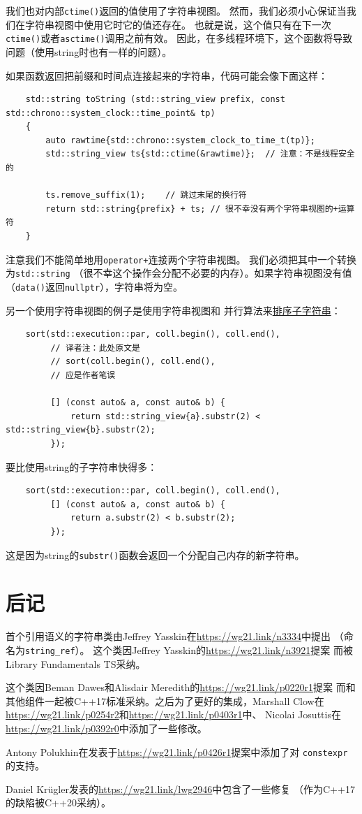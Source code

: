 我们也对内部\texttt{ctime()}返回的值使用了字符串视图。
然而，我们必须小心保证当我们在字符串视图中使用它时它的值还存在。
也就是说，这个值只有在下一次\texttt{ctime()}或者\texttt{asctime()}调用之前有效。
因此，在多线程环境下，这个函数将导致问题（使用string时也有一样的问题）。

如果函数返回把前缀和时间点连接起来的字符串，代码可能会像下面这样：
\begin{lstlisting}
    std::string toString (std::string_view prefix, const std::chrono::system_clock::time_point& tp)
    {
        auto rawtime{std::chrono::system_clock_to_time_t(tp)};
        std::string_view ts{std::ctime(&rawtime)};  // 注意：不是线程安全的

        ts.remove_suffix(1);    // 跳过末尾的换行符
        return std::string{prefix} + ts; // 很不幸没有两个字符串视图的+运算符
    }
\end{lstlisting}
注意我们不能简单地用\texttt{operator+}连接两个字符串视图。
我们必须把其中一个转换为\texttt{std::string}
（很不幸这个操作会分配不必要的内存）。如果字符串视图没有值
（\texttt{data()}返回\texttt{nullptr}），字符串将为空。

另一个使用字符串视图的例子是使用字符串视图和
并行算法来\hyperref[{ch22.1.2.1}]{排序子字符串}：
\begin{lstlisting}
    sort(std::execution::par, coll.begin(), coll.end(),
         // 译者注：此处原文是
         // sort(coll.begin(), coll.end(),
         // 应是作者笔误

         [] (const auto& a, const auto& b) {
             return std::string_view{a}.substr(2) < std::string_view{b}.substr(2);
         });
\end{lstlisting}
要比使用string的子字符串快得多：
\begin{lstlisting}
    sort(std::execution::par, coll.begin(), coll.end(),
         [] (const auto& a, const auto& b) {
             return a.substr(2) < b.substr(2);
         });
\end{lstlisting}
这是因为string的\texttt{substr()}函数会返回一个分配自己内存的新字符串。


\section{后记}
首个引用语义的字符串类由Jeffrey Yasskin在\url{https://wg21.link/n3334}中提出
（命名为\texttt{string\_ref}）。
这个类因Jeffrey Yasskin的\url{https://wg21.link/n3921}提案
而被Library Fundamentals TS采纳。

这个类因Beman Dawes和Alisdair Meredith的\url{https://wg21.link/p0220r1}提案
而和其他组件一起被C++17标准采纳。之后为了更好的集成，Marshall Clow在
\url{https://wg21.link/p0254r2}和\url{https://wg21.link/p0403r1}中、
Nicolai Josuttis在\url{https://wg21.link/p0392r0}中添加了一些修改。

Antony Polukhin在发表于\url{https://wg21.link/p0426r1}提案中添加了对
\texttt{constexpr}的支持。

Daniel Krügler发表的\url{https://wg21.link/lwg2946}中包含了一些修复
（作为C++17的缺陷被C++20采纳）。
